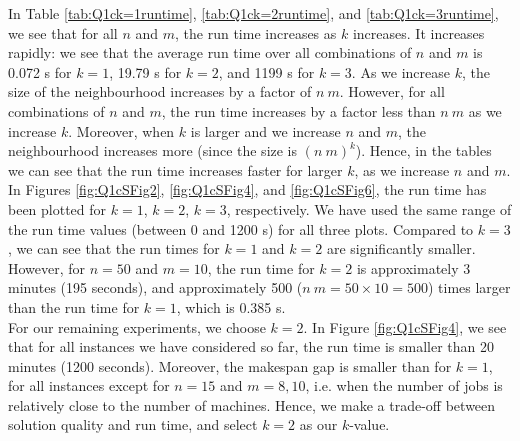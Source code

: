 \documentclass[12pt,a4paper,reqno]{article}
\begin{document}
In Table  \ref{tab:Q1ck=1runtime}, \ref{tab:Q1ck=2runtime}, and \ref{tab:Q1ck=3runtime}, we see that for all $n$ and $m$, the run time increases as $k$ increases. It increases rapidly: we see that the average run time over all combinations of $n$ and $m$ is 0.072 s for $k=1$, 19.79 s for $k=2$, and 1199 s for $k=3$. As we increase $k$, the size of the neighbourhood increases by a factor of $n \> m$. However, for all combinations of $n$ and $m$, the run time increases by a factor less than $n \> m$ as we increase $k$. Moreover, when $k$ is larger and we increase $n$ and $m$, the neighbourhood increases more (since the size is $(n \> m)^k$). Hence, in the tables we can see that the run time increases faster for larger $k$, as we increase $n$ and $m$. In Figures \ref{fig:Q1cSFig2}, \ref{fig:Q1cSFig4}, and \ref{fig:Q1cSFig6}, the run time has been plotted for $k=1$, $k=2$, $k=3$, respectively. We have used the same range of the run time values (between 0 and 1200 s) for all three plots. Compared to $k=3$, we can see that the run times for $k=1$ and $k=2$ are significantly smaller. However, for $n=50$ and $m=10$, the run time for $k=2$ is approximately 3 minutes (195 seconds), and approximately 500 ($n \> m = 50 \times 10 = 500$) times larger than the run time for $k=1$, which is 0.385 s.   \\

For our remaining experiments, we choose $k=2$. In Figure \ref{fig:Q1cSFig4}, we see that for all instances we have considered so far, the run time is smaller than 20 minutes (1200 seconds). Moreover, the makespan gap is smaller than for $k=1$, for all instances except for $n=15$ and $m=8,10$, i.e. when the number of jobs is relatively close to the number of machines. Hence, we make a trade-off between solution quality and run time, and select $k=2$ as our $k$-value.
\end{document}
